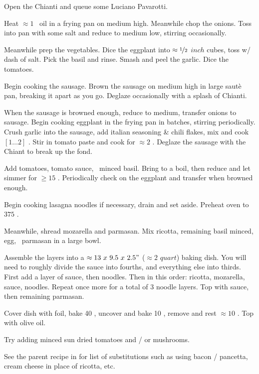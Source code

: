 

\begin{preparation}
\item Open the Chianti and queue some Luciano Pavarotti.

\item Heat $\approx 1$ \Tablespoon~oil in a frying pan on medium high.
	Meanwhile chop the onions.
	Toss into pan with some salt and reduce to medium low, stirring occasionally.

\item Meanwhile prep the vegetables.
	Dice the eggplant into $\approx\nicefrac{1}{2}$ $inch$ cubes, toss w/ dash of salt.
	Pick the basil and rinse.
	Smash and peel the garlic.
	Dice the tomatoes.

\item Begin cooking the sausage.
	Brown the sausage on medium high in large saut\`{e} pan, breaking it apart as you go.
	Deglaze occasionally with a splash of Chianti.
\item When the sausage is browned enough, reduce to medium, transfer onions to sausage.
	Begin cooking eggplant in the frying pan in batches, stirring periodically.
	Crush garlic into the sausage, add italian seasoning \& chili flakes, mix and cook $[1 \dots 2]$ \minute.
	Stir in tomato paste and cook for $\approx 2$ \minute.
	Deglaze the sausage with the Chiant to break up the fond.

\item Add tomatoes, tomato sauce, \onehalf~minced basil.
	Bring to a boil, then reduce and let simmer for $\geq 15$ \minute.
	Periodically check on the eggplant and transfer when browned enough.

\item Begin cooking lasagna noodles if necessary, drain and set aside.
	Preheat oven to $375$ \Fahrenheit.

\item Meanwhile, shread mozarella and parmasan.
	Mix ricotta, remaining basil minced, egg, \onehalf~parmasan in a large bowl.

\item Assemble the layers into a $\approx 13~x~9.5~x~2.5"$ ($\approx 2$ $quart$) baking dish.
	You will need to roughly divide the sauce into fourths, and everything else into thirds.
	First add a layer of sauce, then noodles.
	Then in this order: ricotta, mozarella, sauce, noodles.
	Repeat once more for a total of 3 noodle layers.
	Top with sauce, then remaining parmasan.

\item Cover dish with foil, bake 40 \minute, uncover and bake 10 \minute, remove and rest $\approx 10$ \minute.
	Top with olive oil.
\end{preparation}


\begin{variation}
\item Try adding minced sun dried tomatoes and / or mushrooms.
\item See the parent recipe in  \cite{newCookBook2014} for list of substitutions such as using bacon / pancetta, cream cheese in place of ricotta, etc.
\end{variation}


\recipeend
